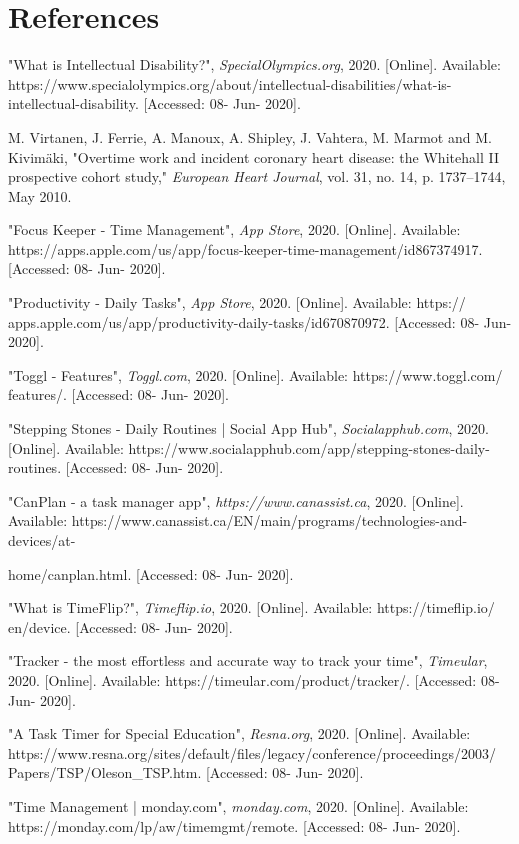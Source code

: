 \documentclass[12pt,letterpaper]{article}
\begin{document}
\newpage
\section{References}
\noindent
[1] "What is Intellectual Disability?", \textit{SpecialOlympics.org}, 2020. [Online]. Available: https://www.specialolympics.org/about/intellectual-disabilities/what-is-intellectual-disability. [Accessed: 08- Jun- 2020].

\medskip

\noindent
[2] M. Virtanen, J. Ferrie, A. Manoux, A. Shipley, J. Vahtera, M. Marmot and M. Kivimäki, "Overtime work and incident coronary heart disease: the Whitehall II prospective cohort study," \textit{European Heart Journal}, vol. 31, no. 14, p. 1737–1744, May 2010.

\medskip

\noindent
[3] "Focus Keeper - Time Management", \textit{App Store}, 2020. [Online]. Available: https://apps.apple.com/us/app/focus-keeper-time-management/id867374917. [Accessed: 08- Jun- 2020].

\medskip

\noindent
[4] "Productivity - Daily Tasks", \textit{App Store}, 2020. [Online]. Available: https://
apps.apple.com/us/app/productivity-daily-tasks/id670870972. [Accessed: 08- Jun- 2020].

\medskip

\noindent
[5] "Toggl - Features", \textit{Toggl.com}, 2020. [Online]. Available: https://www.toggl.com/
features/. [Accessed: 08- Jun- 2020].

\medskip

\noindent
[6] "Stepping Stones - Daily Routines | Social App Hub", \textit{Socialapphub.com}, 2020. [Online]. Available: https://www.socialapphub.com/app/stepping-stones-daily-routines. [Accessed: 08- Jun- 2020].

\medskip

\noindent
[7] "CanPlan - a task manager app", \textit{https://www.canassist.ca}, 2020. [Online]. Available: https://www.canassist.ca/EN/main/programs/technologies-and-devices/at-

\noindent
home/canplan.html. [Accessed: 08- Jun- 2020].

\medskip

\noindent
[8] "What is TimeFlip?", \textit{Timeflip.io}, 2020. [Online]. Available: https://timeflip.io/
en/device. [Accessed: 08- Jun- 2020].

\medskip

\noindent
[9] "Tracker - the most effortless and accurate way to track your time", \textit{Timeular}, 2020. [Online]. Available: https://timeular.com/product/tracker/. [Accessed: 08- Jun- 2020].

\medskip

\noindent
[10] "A Task Timer for Special Education", \textit{Resna.org}, 2020. [Online]. Available: https://www.resna.org/sites/default/files/legacy/conference/proceedings/2003/
Papers/TSP/Oleson\_TSP.htm. [Accessed: 08- Jun- 2020].

\medskip

\noindent
[11] "Time Management | monday.com", \textit{monday.com}, 2020. [Online]. Available: https://monday.com/lp/aw/timemgmt/remote. [Accessed: 08- Jun- 2020].
\end{document}
